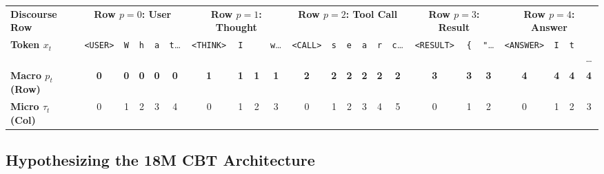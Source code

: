 \documentclass[10pt,twocolumn]{article}
\begin{document}
\begin{table}[t]
{\begin{tabular}{@{}l|ccccccc|cccccccccc|ccccc@{}}
\midrule
\textbf{Discourse Row} & \multicolumn{5}{c|}{\textbf{Row $p=0$: User}} & \multicolumn{4}{c|}{\textbf{Row $p=1$: Thought}} & \multicolumn{6}{c|}{\textbf{Row $p=2$: Tool Call}} & \multicolumn{3}{c|}{\textbf{Row $p=3$: Result}} & \multicolumn{4}{c}{\textbf{Row $p=4$: Answer}} \\
\textbf{Token $x_t$} & \texttt{<USER>} & \texttt{W} & \texttt{h} & \texttt{a} & \texttt{t}\dots & \texttt{<THINK>} & \texttt{I} & \texttt{ } & \texttt{w}\dots & \texttt{<CALL>} & \texttt{s} & \texttt{e} & \texttt{a} & \texttt{r} & \texttt{c}\dots & \texttt{<RESULT>} & \texttt{\{} & \texttt{"}\dots & \texttt{<ANSWER>} & \texttt{I} & \texttt{t} & \texttt{ }\dots \\
\midrule
\textbf{Macro $p_t$ (Row)} & \textbf{0} & \textbf{0} & \textbf{0} & \textbf{0} & \textbf{0} & \textbf{1} & \textbf{1} & \textbf{1} & \textbf{1} & \textbf{2} & \textbf{2} & \textbf{2} & \textbf{2} & \textbf{2} & \textbf{2} & \textbf{3} & \textbf{3} & \textbf{3} & \textbf{4} & \textbf{4} & \textbf{4} & \textbf{4} \\
\textbf{Micro $\tau_t$ (Col)} & 0 & 1 & 2 & 3 & 4 & 0 & 1 & 2 & 3 & 0 & 1 & 2 & 3 & 4 & 5 & 0 & 1 & 2 & 0 & 1 & 2 & 3 \\
\bottomrule
\end{tabular}%
}
\end{table}

\subsection{Hypothesizing the 18M CBT Architecture}
\label{sec:18m_cbt_hypothesis}
\end{document}
